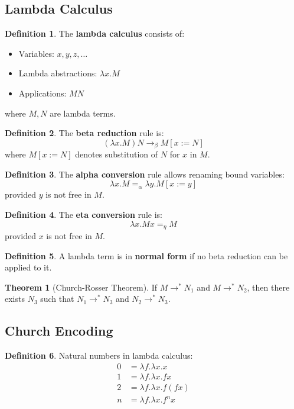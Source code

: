 \documentclass[11pt]{article}
\theoremstyle{definition}
\newtheorem{definition}{Definition}[section]
\newtheorem{theorem}{Theorem}[section]
\begin{document}
\subsection{Lambda Calculus}
\begin{definition}
The \textbf{lambda calculus} consists of:
\begin{itemize}
    \item Variables: $x, y, z, \ldots$
    \item Lambda abstractions: $\lambda x. M$
    \item Applications: $M N$
\end{itemize}
where $M, N$ are lambda terms.
\end{definition}

\begin{definition}
The \textbf{beta reduction} rule is:
$$(\lambda x. M) N \to_\beta M[x := N]$$
where $M[x := N]$ denotes substitution of $N$ for $x$ in $M$.
\end{definition}

\begin{definition}
The \textbf{alpha conversion} rule allows renaming bound variables:
$$\lambda x. M =_\alpha \lambda y. M[x := y]$$
provided $y$ is not free in $M$.
\end{definition}

\begin{definition}
The \textbf{eta conversion} rule is:
$$\lambda x. M x =_\eta M$$
provided $x$ is not free in $M$.
\end{definition}

\begin{definition}
A lambda term is in \textbf{normal form} if no beta reduction can be applied to it.
\end{definition}

\begin{theorem}[Church-Rosser Theorem]
If $M \to^* N_1$ and $M \to^* N_2$, then there exists $N_3$ such that $N_1 \to^* N_3$ and $N_2 \to^* N_3$.
\end{theorem}

\subsection{Church Encoding}
\begin{definition}
Natural numbers in lambda calculus:
\begin{align}
0 &= \lambda f. \lambda x. x \\
1 &= \lambda f. \lambda x. f x \\
2 &= \lambda f. \lambda x. f(f x) \\
n &= \lambda f. \lambda x. f^n x
\end{align}
\end{definition}
\end{document}
